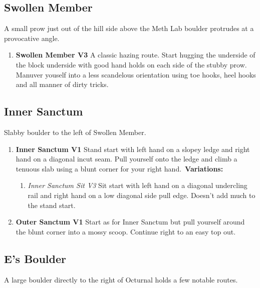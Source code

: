 \subsection*{Swollen Member}\label{bf:Swollen Member}
A small prow just out of the hill side above the Meth Lab boulder protrudes at a provocative angle.

\begin{enumerate}[resume]
	\item\label{rt:Swollen Member} \colorbox{green!20}{\textbf{Swollen Member V3    } }
	\newline A classic hazing route. Start hugging the underside of the block underside with good hand holds on each side of the stubby prow. Manuver youself into a less scandelous orientation using toe hooks, heel hooks and  all manner of dirty tricks.\
\end{enumerate}
\subsection*{Inner Sanctum}\label{bf:Inner Sanctum}
Slabby boulder to the left of Swollen Member.

\begin{enumerate}[resume]
	\item\label{rt:Inner Sanctum} \colorbox{green!20}{\textbf{Inner Sanctum V1    \warn } }
	\newline Stand start with left hand on a slopey ledge and right hand on a diagonal incut seam. Pull yourself onto the ledge and climb a tenuous slab using a blunt corner for your right hand.\
	\newline \textbf{Variations:}
	\begin{enumerate}
		\item\label{vr:Inner Sanctum Sit} \colorbox{green!20}{\emph{Inner Sanctum Sit V3   }  }
		\newline Sit start with left hand on a diagonal undercling rail and right hand on a low diagonal side pull edge. Doesn't add much to the stand start.\
	\end{enumerate}
	\item\label{rt:Outer Sanctum} \colorbox{green!20}{\textbf{Outer Sanctum V1 \ding{72}  } }
	\newline Start as for Inner Sanctum but pull yourself around the blunt corner into a mossy scoop. Continue right to an easy top out.\
\end{enumerate}
\subsection*{E's Boulder}\label{bf:E's Boulder}
A large boulder directly to the right of Octurnal holds a few notable routes.


